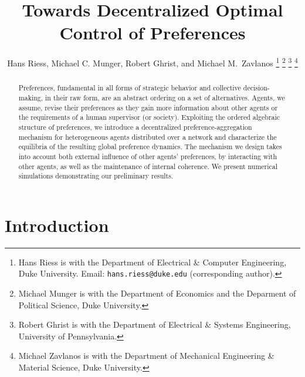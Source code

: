 \documentclass[conference]{ieeeconf}
\begin{document}
\title{\bf Towards Decentralized Optimal Control of Preferences}

\author{Hans Riess, Michael C. Munger, Robert Ghrist, and Michael M.~Zavlanos%
\thanks{Hans Riess is with the Department of Electrical \& Computer Engineering, Duke University. Email: {\tt hans.riess@duke.edu} (corresponding author).}%
\thanks{Michael Munger is with the Department of Economics and the Deparment of Political Science, Duke University.}%
\thanks{Robert Ghrist is with the Department of Electrical \& Systems Engineering, University of Pennsylvania.}%
\thanks{Michael Zavlanos is with the Department of Mechanical Engineering \& Material Science, Duke University.}%
}
\maketitle

\begin{abstract}
Preferences, fundamental in all forms of strategic behavior and collective decision-making, in their raw form, are an abstract ordering on a set of alternatives. Agents, we assume, revise their preferences as they gain more information about other agents or the requirements of a human supervisor (or society). Exploiting the ordered algebraic structure of preferences,  we introduce a decentralized preference-aggregation mechanism for heterogeneous agents distributed over a network and characterize the equilibria of the resulting global preference dynamics. The mechanism we design takes into account both external influence of other agents' preferences, by interacting with other agents, as well as the maintenance of internal coherence. We present numerical simulations demonstrating our preliminary results.
\end{abstract}


\section{Introduction}
\end{document}

